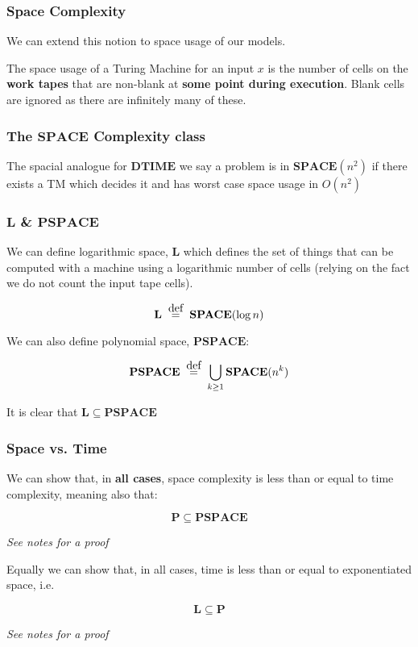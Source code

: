 \documentclass{beamer}
\newcommand\defeq{\stackrel{\mathclap{\normalfont\mbox{def}}}{=}}
\begin{document}
  \begin{frame}
    \frametitle{Space Complexity}

    We can extend this notion to space usage of our models.

    The space usage of a Turing Machine for an input $x$ is the number of cells on the \textbf{work tapes} that are non-blank at \textbf{some point during execution}. Blank cells are ignored as there are infinitely many of these.

  \end{frame}

  \begin{frame}
    \frametitle{The $\mathbf{SPACE}$ Complexity class}

    The spacial analogue for $\mathbf{DTIME} $ we say a problem is in $\mathbf{SPACE} (n^{2})$ if there exists a TM which decides it and has worst case space usage in $O(n^{2})$
  \end{frame}

  \begin{frame}
    \frametitle{$\mathbf{L}$ \& $\mathbf{PSPACE}$ }

    We can define logarithmic space, $\mathbf{L} $ which defines the set of things that can be computed with a machine using a logarithmic number of cells (relying on the fact we do not count the input tape cells).

    \begin{definition}[Logspace]
      \[
        \mathbf{L} \;\; \defeq \;\; \mathbf{SPACE}(\log n)
      \]

      We can also define polynomial space, $\mathbf{PSPACE} $:

      \begin{definition}
        \[
          \mathbf{PSPACE} \;\; \defeq \;\; \bigcup_{k \geq 1}\mathbf{SPACE}(n^{k})
        \]

        It is clear that $\mathbf{L} \subseteq \mathbf{PSPACE} $
      \end{definition}

    \end{definition}
  \end{frame}
  \begin{frame}
    \frametitle{Space vs. Time}
    We can show that, in \textbf{all cases}, space complexity is less than or equal to time complexity, meaning also that:

    \[
      \mathbf{P} \subseteq \mathbf{PSPACE}
    \]

    \small\textit{See notes for a proof}

    Equally we can show that, in all cases, time is less than or equal to exponentiated space, i.e.

    \[
      \mathbf{L} \subseteq \mathbf{P}
    \]

    \small\textit{See notes for a proof}
  \end{frame}
\end{document}
